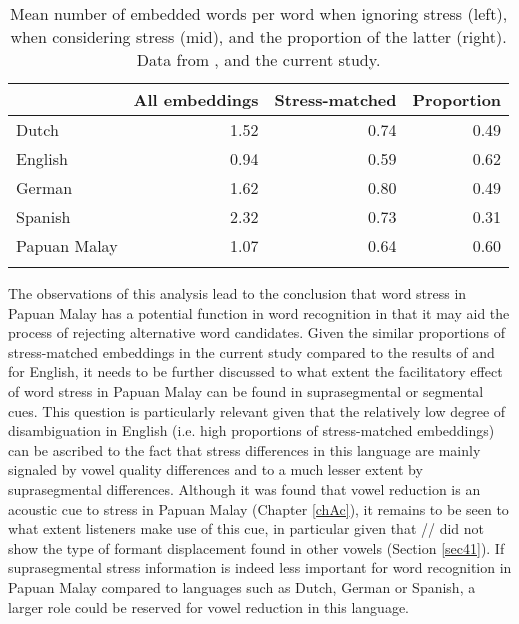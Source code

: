 \begin{table}
\caption{Mean number of embedded words per word when ignoring stress (left), when considering stress (mid), and the proportion of the latter (right). Data from \citet{cutler_phonemic_2004}, \citet{cutler_explaining_2006} and the current study.}
\label{tab46}
\begin{tabularx}{0.9\textwidth}{p{2.5cm}rrr}
\lsptoprule
& All embeddings & Stress-matched & Proportion\\
\midrule
 Dutch & 1.52 & 0.74 & 0.49\\
 English & 0.94 & 0.59 & 0.62\\
 German & 1.62 & 0.80 & 0.49\\
 Spanish & 2.32 & 0.73 & 0.31\\
 Papuan Malay & 1.07 & 0.64 & 0.60\\
\lspbottomrule
\end{tabularx}
\end{table}

The observations of this analysis lead to the conclusion that word stress in Papuan Malay has a potential function in word recognition in that it may aid the process of rejecting alternative word candidates. Given the similar proportions of stress-matched embeddings in the current study compared to the results of \citet{cutler_phonemic_2004} and \citet{cutler_explaining_2006} for English, it needs to be further discussed to what extent the facilitatory effect of word stress in Papuan Malay can be found in suprasegmental or segmental cues. This question is particularly relevant given that the relatively low degree of disambiguation in English (i.e. high proportions of stress-matched embeddings) can be ascribed to the fact that stress differences in this language are mainly signaled by vowel quality differences and to a much lesser extent by suprasegmental differences. Although it was found that vowel reduction is an acoustic cue to stress in Papuan Malay (Chapter \ref{chAc}), it remains to be seen to what extent listeners make use of this cue, in particular given that // did not show the type of formant displacement found in other vowels (Section \ref{sec41}). If suprasegmental stress information is indeed less important for word recognition in Papuan Malay compared to languages such as Dutch, German or Spanish, a larger role could be reserved for vowel reduction in this language.\par

